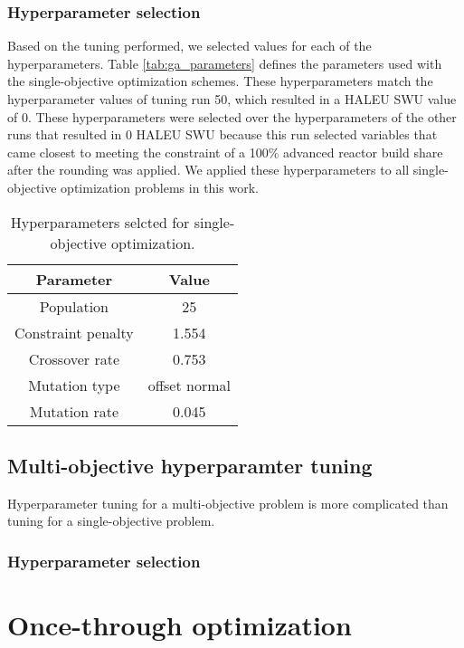 \subsubsection{Hyperparameter selection}
Based on the tuning performed, we selected values for each of the 
hyperparameters. Table \ref{tab:ga_parameters} defines the 
parameters used with the single-objective optimization schemes. These 
hyperparameters match the hyperparameter values of tuning run 50, 
which resulted in a \gls{HALEU} \gls{SWU} value of 0. These hyperparameters 
were selected over the hyperparameters of the other runs that resulted in 
0 \gls{HALEU} \gls{SWU} because this run selected variables that came closest to 
meeting the constraint of a 100\% advanced reactor build share after the rounding 
was applied. We applied these hyperparameters to all single-objective 
optimization problems in this work. 

\begin{table}
    \centering
    \caption{Hyperparameters selcted for single-objective optimization.}
    \label{tab:soga_parameters}
    \begin{tabular}{c c}
        \hline
        Parameter & Value \\
        \hline
        Population & 25 \\
        Constraint penalty & 1.554\\
        Crossover rate & 0.753\\
        Mutation type & offset normal\\
        Mutation rate & 0.045\\
        \hline
    \end{tabular}
\end{table}

\subsection{Multi-objective hyperparamter tuning}
Hyperparameter tuning for a multi-objective problem is more complicated 
than tuning for a single-objective problem. 

\subsubsection{Hyperparameter selection}

\section{Once-through optimization}
